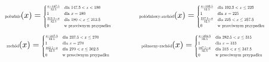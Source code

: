 \documentclass{article}
\begin{document}
\begin{equation*}
\begin{minipage}{0.5\textwidth}
\centering
$\text{\scalebox{0.5}{południe}}(x) =
\scalebox{0.5}{$
\begin{cases}
\frac{x - 147.5}{32.5} & \text{dla } 147.5 < x < 180 \\
1 & \text{dla } x = 180 \\
\frac{212.5 - x}{32.5} & \text{dla } 180 < x \leq 212.5 \\
0 & \text{w przeciwnym przypadku}
\end{cases}
$}$
\end{minipage}%
\begin{minipage}{0.5\textwidth}
\centering
$\text{\scalebox{0.5}{połódniowy-zachód}}(x) =
\scalebox{0.5}{$
\begin{cases}
\frac{x - 192.5}{32.5} & \text{dla } 192.5 < x \leq 225 \\
1 & \text{dla } x = 225 \\
\frac{257.5 - x}{32.5} & \text{dla } 225 < x \leq 257.5 \\
0 & \text{w przeciwnym przypadku}
\end{cases}
$}$
\end{minipage}
\end{equation*}
\begin{equation*}
\begin{minipage}{0.5\textwidth}
\centering
$\text{\scalebox{0.5}{zachód}}(x) =
\scalebox{0.5}{$
\begin{cases}
\frac{x - 237.5}{32.5} & \text{dla } 237.5 < x \leq 270 \\
1 & \text{dla } x = 270 \\
\frac{302.5 - x}{32.5} & \text{dla } 270 < x \leq 302.5 \\
0 & \text{w przeciwnym przypadku}
\end{cases}
$}$
\end{minipage}%
\begin{minipage}{0.5\textwidth}
\centering
$\text{\scalebox{0.5}{północny-zachód}}(x) =
\scalebox{0.5}{$
\begin{cases}
\frac{x - 282.5}{32.5} & \text{dla } 282.5 < x \leq 315 \\
1 & \text{dla } x = 315 \\
\frac{347.5 - x}{32.5} & \text{dla } 315 < x \leq 347.5 \\
0 & \text{w przeciwnym przypadku}
\end{cases}
$}$
\end{minipage}
\end{equation*}
\end{document}
